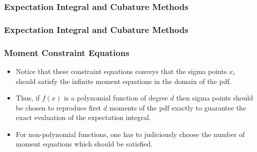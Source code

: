 \documentclass{beamer}
\begin{document}
\begin{frame}
\frametitle{Expectation Integral and Cubature Methods}
\end{frame}
\begin{frame}
\frametitle{Expectation Integral and Cubature Methods}
\end{frame}
\begin{frame}
\frametitle{Moment Constraint Equations}
\begin{itemize}[<+->]
\item Notice that these constraint equations conveys that the sigma points $x_i$ should satisfy the infinite moment equations in the domain of the pdf.
\item Thus, if $f(x)$ is a polynomial function of degree $d$ then sigma points should be chosen to reproduce first $d$ moments of the pdf exactly to guarantee the exact evaluation of the expectation integral.
\item For non-polynomial functions, one has to judiciously choose the number of moment equations which should be satisfied. 
\end{itemize}
\end{frame}
\end{document}
